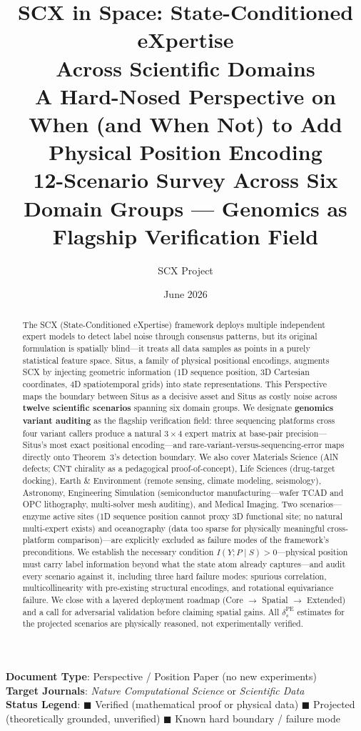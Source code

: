 \documentclass[12pt,a4paper]{article}
\title{
  \textbf{SCX in Space: State-Conditioned eXpertise\\ Across Scientific Domains}\\[8pt]
  \large A Hard-Nosed Perspective on When (and When Not) to Add Physical Position Encoding\\[4pt]
  \normalsize 12-Scenario Survey Across Six Domain Groups — Genomics as Flagship Verification Field
}
\author{SCX Project}
\date{June 2026}
\begin{document}
\maketitle

\begin{center}
\textbf{Document Type}: Perspective / Position Paper (no new experiments)\\
\textbf{Target Journals}: \textit{Nature Computational Science} or \textit{Scientific Data}\\[6pt]
\textbf{Status Legend}:
\;\textcolor{verified}{$\blacksquare$ Verified (mathematical proof or physical data)}
\;\textcolor{projected}{$\blacksquare$ Projected (theoretically grounded, unverified)}
\;\textcolor{warning}{$\blacksquare$ Known hard boundary / failure mode}
\end{center}

\vspace{12pt}
\begin{abstract}
The SCX (State-Conditioned eXpertise) framework deploys multiple independent expert models to detect label noise through consensus patterns, but its original formulation is spatially blind—it treats all data samples as points in a purely statistical feature space. Situs, a family of physical positional encodings, augments SCX by injecting geometric information (1D sequence position, 3D Cartesian coordinates, 4D spatiotemporal grids) into state representations. This Perspective maps the boundary between Situs as a decisive asset and Situs as costly noise across \textbf{twelve scientific scenarios} spanning six domain groups. We designate \textbf{genomics variant auditing} as the flagship verification field: three sequencing platforms cross four variant callers produce a natural $3 \times 4$ expert matrix at base-pair precision—Situs's most exact positional encoding—and rare-variant-versus-sequencing-error maps directly onto Theorem~3's detection boundary. We also cover Materials Science (AlN defects; CNT chirality as a pedagogical proof-of-concept), Life Sciences (drug-target docking), Earth \& Environment (remote sensing, climate modeling, seismology), Astronomy, Engineering Simulation (semiconductor manufacturing—wafer TCAD and OPC lithography, multi-solver mesh auditing), and Medical Imaging. Two scenarios—enzyme active sites (1D sequence position cannot proxy 3D functional site; no natural multi-expert exists) and oceanography (data too sparse for physically meaningful cross-platform comparison)—are explicitly excluded as failure modes of the framework's preconditions. We establish the necessary condition $I(Y;P \mid S)>0$—physical position must carry label information beyond what the state atom already captures—and audit every scenario against it, including three hard failure modes: spurious correlation, multicollinearity with pre-existing structural encodings, and rotational equivariance failure. We close with a layered deployment roadmap (Core $\to$ Spatial $\to$ Extended) and a call for adversarial validation before claiming spatial gains. All $\delta_s^{\mathrm{PE}}$ estimates for the projected scenarios are physically reasoned, not experimentally verified.
\end{abstract}
\end{document}
